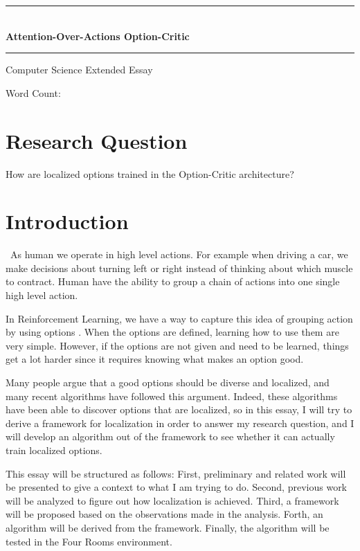 \documentclass{article}
\date{}
\begin{document}
	\begin{center}
		\large{\rule{420pt}{0.4pt}}\\
		\vspace{0.15in}
		\LARGE{\bfseries{Attention-Over-Actions Option-Critic}}
		\vspace{0.1in}
		\large{\rule{420pt}{0.4pt}}
		
		\large{Computer Science Extended Essay}
		
		\normalsize{Word Count:}
	\end{center}
	\vspace{0.1in}
	\section*{Research Question}
	How are localized options trained in the Option-Critic architecture? \\
	\vspace{0.1in}
	\section{Introduction}
	\qquad \ As human we operate in high level actions. For example when driving a car, we make decisions about turning left or right instead of thinking about which muscle to contract. Human have the ability to group a chain of actions into one single high level action. 
	
	\quad In Reinforcement Learning, we have a way to capture this idea of grouping action by using options \cite{SUTTON1999181}. When the options are defined, learning how to use them are very simple. However, if the options are not given and need to be learned, things get a lot harder since it requires knowing what makes an option good. 

	\quad Many people argue that a good options should be diverse and localized, and many recent algorithms have followed this argument. Indeed, these algorithms have been able to discover options that are localized, so in this essay, I will try to derive a framework for localization in order to answer my research question, and I will develop an algorithm out of the framework to see whether it can actually train localized options. 
	
	\quad This essay will be structured as follows: First, preliminary and related work will be presented to give a context to what I am trying to do. Second, previous work will be analyzed to figure out how localization is achieved. Third, a framework will be proposed based on the observations made in the analysis. Forth, an algorithm will be derived from the framework. Finally, the algorithm will be tested in the Four Rooms environment.
\end{document}
